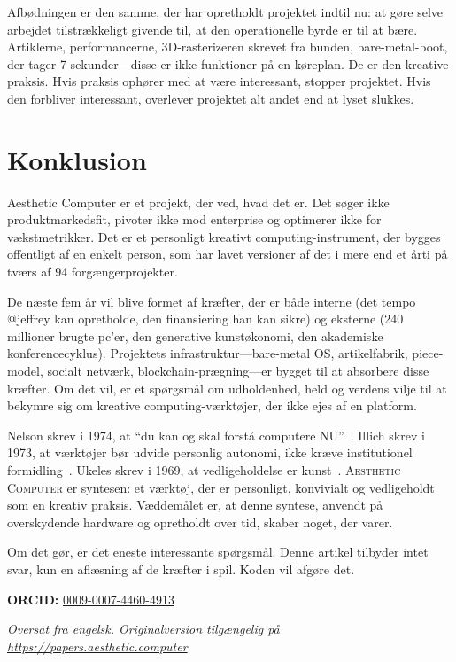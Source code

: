 \documentclass[10pt,letterpaper,twocolumn]{article}
\newcommand{\ac}{\textsc{Aesthetic Computer}}
\begin{document}
Afbødningen er den samme, der har opretholdt projektet indtil nu: at gøre selve arbejdet tilstrækkeligt givende til, at den operationelle byrde er til at bære. Artiklerne, performancerne, 3D-rasterizeren skrevet fra bunden, bare-metal-boot, der tager 7 sekunder---disse er ikke funktioner på en køreplan. De er den kreative praksis. Hvis praksis ophører med at være interessant, stopper projektet. Hvis den forbliver interessant, overlever projektet alt andet end at lyset slukkes.


\section{Konklusion}

Aesthetic Computer er et projekt, der ved, hvad det er. Det søger ikke produktmarkedsfit, pivoter ikke mod enterprise og optimerer ikke for vækstmetrikker. Det er et personligt kreativt computing-instrument, der bygges offentligt af en enkelt person, som har lavet versioner af det i mere end et årti på tværs af 94 forgængerprojekter.

De næste fem år vil blive formet af kræfter, der er både interne (det tempo @jeffrey kan opretholde, den finansiering han kan sikre) og eksterne (240 millioner brugte pc'er, den generative kunstøkonomi, den akademiske konferencecyklus). Projektets infrastruktur---bare-metal OS, artikelfabrik, piece-model, socialt netværk, blockchain-prægning---er bygget til at absorbere disse kræfter. Om det vil, er et spørgsmål om udholdenhed, held og verdens vilje til at bekymre sig om kreative computing-værktøjer, der ikke ejes af en platform.

Nelson skrev i 1974, at ``du kan og skal forstå computere NU''~\citep{nelson1974computerlib}. Illich skrev i 1973, at værktøjer bør udvide personlig autonomi, ikke kræve institutionel formidling~\citep{illich1973tools}. Ukeles skrev i 1969, at vedligeholdelse er kunst~\citep{ukeles1969manifesto}. \ac{} er syntesen: et værktøj, der er personligt, konvivialt og vedligeholdt som en kreativ praksis. Væddemålet er, at denne syntese, anvendt på overskydende hardware og opretholdt over tid, skaber noget, der varer.

Om det gør, er det eneste interessante spørgsmål. Denne artikel tilbyder intet svar, kun en aflæsning af de kræfter i spil. Koden vil afgøre det.

\vspace{0.5em}
\noindent\textbf{ORCID:} \href{https://orcid.org/0009-0007-4460-4913}{0009-0007-4460-4913}

\vspace{0.5em}\noindent\textit{Oversat fra engelsk. Originalversion tilgængelig på \url{https://papers.aesthetic.computer}}




\end{document}

